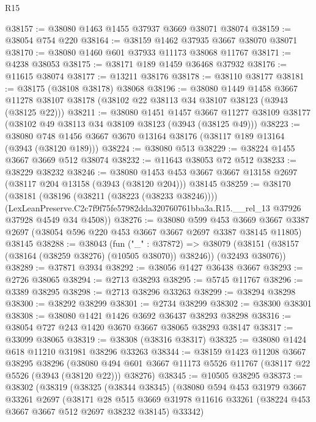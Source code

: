\begin{lexlean}{R15}
\begin{coremodule}
@38157 := @38080 @1463 @1455 @37937 @3669 @38071 @38074
@38159 := @38054 @754 @220
@38164 := @38159 @1462 @37935 @3667 @38070 @38071
@38170 := @38080 @1460 @601 @37933 @11173 @38068 @11767
@38171 := @4238 @38053
@38175 := @38171 @189 @1459 @36468 @37932
@38176 := @11615 @38074
@38177 := @13211 @38176
@38178 := @38110 @38177
@38181 := @38175 (@38108 @38178) @38068
@38196 := @38080
    @1449
    @1458
    @3667
    @11278
    @38107
    @38178
    (@38102 @22 @38113 @34 @38107 @38123 (@3943 (@38125 @22)))
@38211 := @38080
    @1451
    @1457
    @3667
    @11277
    @38109
    @38177
    (@38102 @49 @38113 @34 @38109 @38123 (@3943 (@38125 @49)))
@38223 := @38080 @748 @1456 @3667 @3670 @13164 @38176 (@38117 @189 @13164 (@3943 (@38120 @189)))
@38224 := @38080 @513
@38229 := @38224 @1455 @3667 @3669 @512 @38074
@38232 := @11643 @38053 @72 @512
@38233 := @38229 @38232
@38246 := @38080
    @1453
    @453
    @3667
    @3667
    @13158
    @2697
    (@38117 @204 @13158 (@3943 (@38120 @204)))
    @38145
@38259 := @38170
    (@38181
      (@38196 (@38211 (@38223 (@38233 @38246))))
      (LexLeanPreserve.C2c7f9f75fe57982dda320760761bba3a.R15.__rel_13
        @37926
        @37928
        @4549
        @34
        @4508))
@38276 := @38080
    @599
    @453
    @3669
    @3667
    @3387
    @2697
    (@38054 @596 @220 @453 @3667 @3667 @2697 @3387 @38145 @11805)
    @38145
@38288 := @38043
    (fun ("_" : @37872) =>
    @38079 (@38151 (@38157 (@38164 (@38259 @38276) (@10505 @38070)) @38246)) (@32493 @38076))
@38289 := @37871 @3934
@38292 := @38056 @1427 @36438 @3667
@38293 := @2726 @38065
@38294 := @2713 @38293
@38295 := @5745 @11767
@38296 := @3389 @38295
@38298 := @2713 @38296 @33263
@38299 := @38294 @38298
@38300 := @38292 @38299
@38301 := @2734 @38299
@38302 := @38300 @38301
@38308 := @38080 @1421 @1426 @3692 @36437 @38293 @38298
@38316 := @38054 @727 @243 @1420 @3670 @3667 @38065 @38293 @38147
@38317 := @33099 @38065
@38319 := @38308 (@38316 @38317)
@38325 := @38080 @1424 @618 @11210 @31981 @38296 @33263
@38344 := @38159
    @1423
    @11208
    @3667
    @38295
    @38296
    (@38080 @494 @601 @3667 @11173 @5526 @11767 (@38117 @22 @5526 (@3943 (@38120 @22))) @38276)
@38345 := @10505 @38295
@38373 := @38302
    (@38319
      (@38325
        (@38344 @38345)
        (@38080
          @594
          @453
          @31979
          @3667
          @33261
          @2697
          (@38171
            @28
            @515
            @3669
            @31978
            @11616
            @33261
            (@38224 @453 @3667 @3667 @512 @2697 @38232 @38145)
            @33342)

\end{coremodule}
\end{lexlean}
